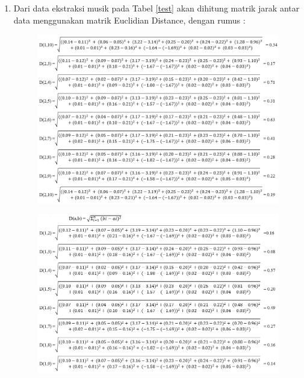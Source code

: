 \vspace{5cm}
\begin{enumerate}
    \item  Dari data ekstraksi musik pada Tabel \ref{test} akan dihitung  matrik jarak antar data menggunakan matrik Euclidian Distance, dengan rumus :
    \begin{figure} [htbp]
    \includegraphics[scale=0.32]{figures/AHC1.jpg}
    \end{figure}
    
    \begin{figure} [htbp]
    \includegraphics[scale=0.32] {figures/AHC2.jpg}
    \end{figure}
    \vspace{4cm}
    

\end{enumerate}
